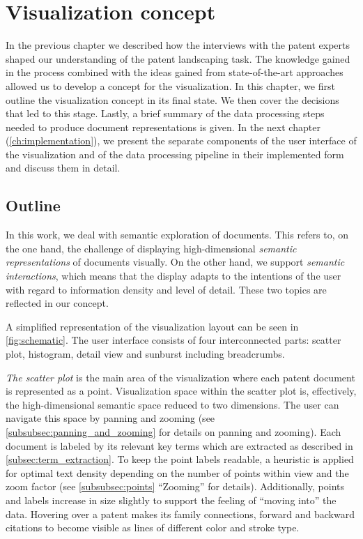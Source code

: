 
\chapter{Visualization concept}
\label{ch:concept}

In the previous chapter we described how the interviews with the patent experts shaped our understanding of the patent landscaping task.
The knowledge gained in the process combined with the ideas gained from state-of-the-art approaches allowed us to develop a concept for the visualization.
In this chapter, we first outline the visualization concept in its final state.
We then cover the decisions that led to this stage.
Lastly, a brief summary of the data processing steps needed to produce document representations is given.
In the next chapter (\autoref{ch:implementation}), we present the separate components of the user interface of the visualization and of the data processing pipeline in their implemented form and discuss them in detail.


\section{Outline}
\label{sec:outline_visualization_concept}

In this work, we deal with semantic exploration of documents.
This refers to, on the one hand, the challenge of displaying high-dimensional \textit{semantic representations} of documents visually.
On the other hand, we support \textit{semantic interactions}, which means that the display adapts to the intentions of the user with regard to information density and level of detail.
These two topics are reflected in our concept.

A simplified representation of the visualization layout can be seen in \autoref{fig:schematic}.
The user interface consists of four interconnected parts: scatter plot, histogram, detail view and sunburst including breadcrumbs.

\textit{The scatter plot} is the main area of the visualization where each patent document is represented as a point.
Visualization space within the scatter plot is, effectively, the high-dimensional semantic space reduced to two dimensions. 
The user can navigate this space by panning and zooming (see \autoref{subsubsec:panning_and_zooming} for details on panning and zooming).
Each document is labeled by its relevant key terms which are extracted as described in \autoref{subsec:term_extraction}.
To keep the point labels readable, a heuristic is applied for optimal text density depending on the number of points within view and the zoom factor (see \autoref{subsubsec:points} ``Zooming'' for details).
Additionally, points and labels increase in size slightly to support the feeling of ``moving into'' the data.
Hovering over a patent makes its family connections, forward and backward citations to become visible as lines of different color and stroke type.

